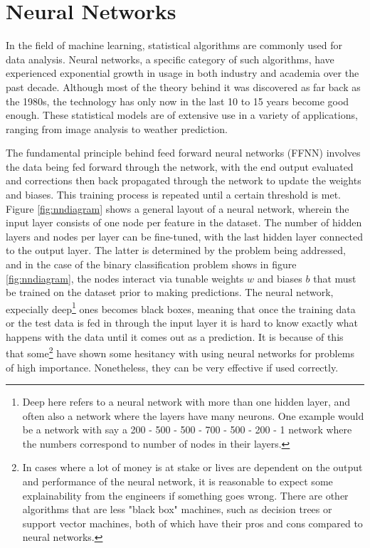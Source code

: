 \section{Neural Networks}
In the field of machine learning, statistical algorithms are commonly used for data analysis. 
Neural networks, a specific category of such algorithms, have experienced exponential growth in 
usage in both industry and academia over the past decade. Although most of the theory behind it was 
discovered as far back as the 1980s, the technology has only now in the last 10 to 15 years become good enough. 
These statistical models are of extensive use in a variety of applications, ranging from image analysis to 
weather prediction. \par 
The fundamental principle behind feed forward neural networks (FFNN) involves the 
data being fed forward through the network, with the end output evaluated and corrections then back 
propagated through the network to update the weights and biases. This training process is repeated 
until a certain threshold is met. Figure \ref{fig:nndiagram} shows a general layout of a neural 
network, wherein the input layer consists of one node per feature in the dataset. The number of 
hidden layers and nodes per layer can be fine-tuned, with the last hidden layer connected to the 
output layer. The latter is determined by the problem being addressed, and in the case of the 
binary classification problem shows in figure \ref{fig:nndiagram}, the nodes interact via 
tunable weights $w$ and biases $b$ that must be trained on the dataset prior to making predictions.
The neural network, expecially deep\footnote{Deep here refers to a neural network with more than 
one hidden layer, and often also a network where the layers have many neurons. One example would be a network with say a 
200 - 500 - 500 - 700 - 500 - 200 - 1 network where the numbers correspond to number of nodes in their layers.} 
ones becomes black boxes, meaning that once the training data or the test data is fed in through 
the input layer it is hard to know exactly what happens with the data until it comes out as a 
prediction. It is because of this that some\footnote{In cases where a lot of money is at stake or 
lives are dependent on the output and performance of the neural network, it is reasonable to expect 
some explainability from the engineers if something goes wrong. There are other algorithms that are less 
"black box" machines, such as decision trees\cite{Chen_2016} or support vector machines\cite{cortes1995support}, 
both of which have their pros and cons compared to neural networks.} have shown some hesitancy 
with using neural networks for problems of high importance. Nonetheless, they can be very 
effective if used correctly. 


